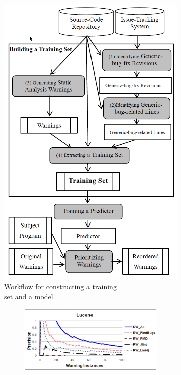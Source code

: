 \documentclass{article}
\begin{document}
 \begin{figure}[H]
     \begin{subfigure}{0.5\textwidth}
         \centering
         \includegraphics[scale=0.3]{./src/automatic_training_set_workflow.png}
         \caption{Workflow for constructing a training\\ set and a model}\label{automatic_training_set:workflow}
     \end{subfigure}%
     \begin{subfigure}{0.5\textwidth}
         \begin{subfigure}{.5\textwidth}
             \centering
             \includegraphics[scale=0.35]{./src/automatic_training_set_results1.png}

\end{subfigure}
\end{subfigure}
\end{figure}
\end{document}
